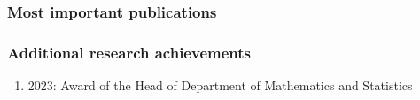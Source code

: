 \subsubsection*{Most important publications}


\nocite{z:Zathurecky2025}
\nocite{z:Pribylova2025}
\nocite{z:Zapadlo2023}

\begin{refcontext}[sorting=nyt,labelprefix=Z]
    \printbibliography[heading=none]
\end{refcontext}

\endrefsection

\vspace{-0.75\baselineskip}
\subsubsection*{Additional research achievements}

\begin{enumerate}
    \item 2023: Award of the Head of Department of Mathematics and Statistics
\end{enumerate}

